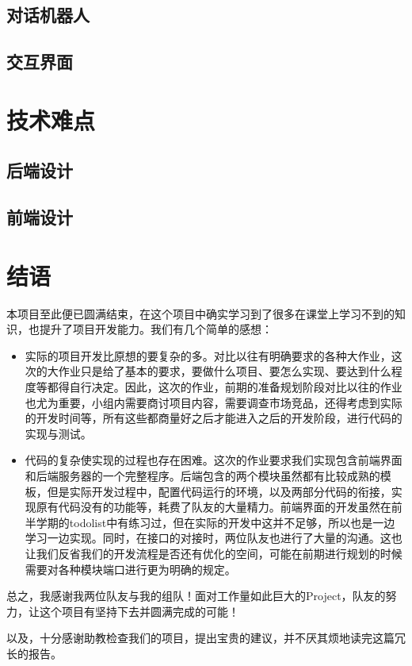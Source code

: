 \documentclass[a4paper, 11pt]{article}
\begin{document}
\subsection{对话机器人} %
\subsection{交互界面} %
\section{技术难点} %
\subsection{后端设计} %
\subsection{前端设计} %
\section{结语}
\par 本项目至此便已圆满结束，在这个项目中确实学习到了很多在课堂上学习不到的知识，也提升了项目开发能力。我们有几个简单的感想：
\begin{itemize}
\item 实际的项目开发比原想的要复杂的多。对比以往有明确要求的各种大作业，这次的大作业只是给了基本的要求，要做什么项目、要怎么实现、要达到什么程度等都得自行决定。因此，这次的作业，前期的准备规划阶段对比以往的作业也尤为重要，小组内需要商讨项目内容，需要调查市场竞品，还得考虑到实际的开发时间等，所有这些都商量好之后才能进入之后的开发阶段，进行代码的实现与测试。
\item 代码的复杂使实现的过程也存在困难。这次的作业要求我们实现包含前端界面和后端服务器的一个完整程序。后端包含的两个模块虽然都有比较成熟的模板，但是实际开发过程中，配置代码运行的环境，以及两部分代码的衔接，实现原有代码没有的功能等，耗费了队友的大量精力。前端界面的开发虽然在前半学期的todolist中有练习过，但在实际的开发中这并不足够，所以也是一边学习一边实现。同时，在接口的对接时，两位队友也进行了大量的沟通。这也让我们反省我们的开发流程是否还有优化的空间，可能在前期进行规划的时候需要对各种模块端口进行更为明确的规定。
\end{itemize}
\par 总之，我感谢我两位队友与我的组队！面对工作量如此巨大的Project，队友的努力，让这个项目有坚持下去并圆满完成的可能！
\par 以及，十分感谢助教检查我们的项目，提出宝贵的建议，并不厌其烦地读完这篇冗长的报告。
\end{document}
